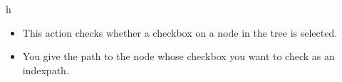 h
\begin{itemize}
\item This action checks whether a checkbox on a node in the tree is selected.
\item You give the path to the node whose checkbox you want to check as an indexpath. 
\end{itemize}
